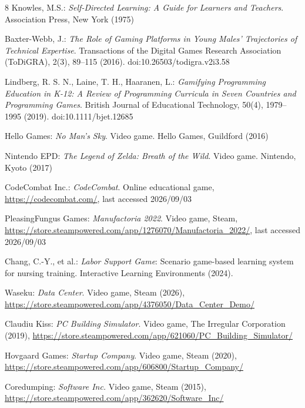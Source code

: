 \documentclass[runningheads]{llncs}
\begin{document}
\begin{thebibliography}{8}
Knowles, M.S.:
\textit{Self-Directed Learning: A Guide for Learners and Teachers}.
Association Press, New York (1975)

Baxter-Webb, J.:
\textit{The Role of Gaming Platforms in Young Males' Trajectories of Technical Expertise}.
Transactions of the Digital Games Research Association (ToDiGRA),
2(3), 89--115 (2016).
doi:10.26503/todigra.v2i3.58

Lindberg, R. S. N., Laine, T. H., Haaranen, L.:
\textit{Gamifying Programming Education in K-12: A Review of Programming Curricula in Seven Countries and Programming Games}.
British Journal of Educational Technology,
50(4), 1979--1995 (2019).
doi:10.1111/bjet.12685

Hello Games:
\textit{No Man's Sky}.
Video game. Hello Games, Guildford (2016)

Nintendo EPD:
\textit{The Legend of Zelda: Breath of the Wild}.
Video game. Nintendo, Kyoto (2017)

CodeCombat Inc.:
\textit{CodeCombat}.
Online educational game, \url{https://codecombat.com/}, last accessed 2026/09/03

PleasingFungus Games:
\textit{Manufactoria 2022}.
Video game, Steam, \url{https://store.steampowered.com/app/1276070/Manufactoria_2022/}, last accessed 2026/09/03

Chang, C.-Y., et al.:
\textit{Labor Support Game}: Scenario game-based learning system for nursing training.
Interactive Learning Environments (2024). 

Waseku:
\textit{Data Center}.
Video game, Steam (2026), \url{https://store.steampowered.com/app/4376050/Data_Center_Demo/}

Claudiu Kiss:
\textit{PC Building Simulator}.
Video game, The Irregular Corporation (2019), \url{https://store.steampowered.com/app/621060/PC_Building_Simulator/}

Hovgaard Games:
\textit{Startup Company}.
Video game, Steam (2020), \url{https://store.steampowered.com/app/606800/Startup_Company/}

Coredumping:
\textit{Software Inc.}
Video game, Steam (2015), \url{https://store.steampowered.com/app/362620/Software_Inc/}


\end{thebibliography}
\end{document}
